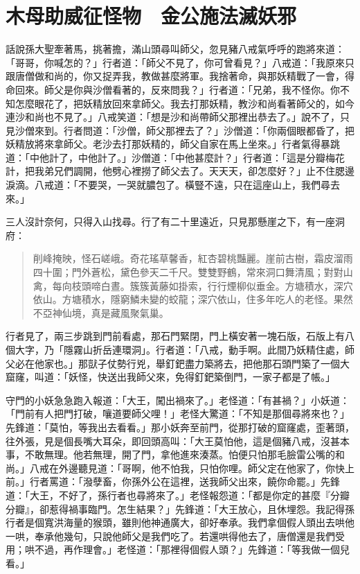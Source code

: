 
\chapter{木母助威征怪物　金公施法滅妖邪}

話說孫大聖牽著馬，挑著擔，滿山頭尋叫師父，忽見豬八戒氣呼呼的跑將來道：「哥哥，你喊怎的？」行者道：「師父不見了，你可曾看見？」八戒道：「我原來只跟唐僧做和尚的，你又捉弄我，教做甚麼將軍。我捨著命，與那妖精戰了一會，得命回來。師父是你與沙僧看著的，反來問我？」行者道：「兄弟，我不怪你。你不知怎麼眼花了，把妖精放回來拿師父。我去打那妖精，教沙和尚看著師父的，如今連沙和尚也不見了。」八戒笑道：「想是沙和尚帶師父那裡出恭去了。」說不了，只見沙僧來到。行者問道：「沙僧，師父那裡去了？」沙僧道：「你兩個眼都昏了，把妖精放將來拿師父。老沙去打那妖精的，師父自家在馬上坐來。」行者氣得暴跳道：「中他計了，中他計了。」沙僧道：「中他甚麼計？」行者道：「這是分瓣梅花計，把我弟兄們調開，他劈心裡撈了師父去了。天天天，卻怎麼好？」止不住腮邊淚滴。八戒道：「不要哭，一哭就膿包了。橫豎不遠，只在這座山上，我們尋去來。」

三人沒計奈何，只得入山找尋。行了有二十里遠近，只見那懸崖之下，有一座洞府：
\begin{quote}
削峰掩映，怪石嵯峨。奇花瑤草馨香，紅杏碧桃豔麗。崖前古樹，霜皮溜雨四十圍；門外蒼松，黛色參天二千尺。雙雙野鶴，常來洞口舞清風；對對山禽，每向枝頭啼白晝。簇簇黃藤如掛索，行行煙柳似垂金。方塘積水，深穴依山。方塘積水，隱窮鱗未變的蛟龍；深穴依山，住多年吃人的老怪。果然不亞神仙境，真是藏風聚氣巢。
\end{quote}

行者見了，兩三步跳到門前看處，那石門緊閉，門上橫安著一塊石版，石版上有八個大字，乃「隱霧山折岳連環洞」。行者道：「八戒，動手啊。此間乃妖精住處，師父必在他家也。」那獃子仗勢行兇，舉釘鈀盡力築將去，把他那石頭門築了一個大窟窿，叫道：「妖怪，快送出我師父來，免得釘鈀築倒門，一家子都是了帳。」

守門的小妖急急跑入報道：「大王，闖出禍來了。」老怪道：「有甚禍？」小妖道：「門前有人把門打破，嚷道要師父哩！」老怪大驚道：「不知是那個尋將來也？」先鋒道：「莫怕，等我出去看看。」那小妖奔至前門，從那打破的窟窿處，歪著頭，往外張，見是個長嘴大耳朵，即回頭高叫：「大王莫怕他，這是個豬八戒，沒甚本事，不敢無理。他若無理，開了門，拿他進來湊蒸。怕便只怕那毛臉雷公嘴的和尚。」八戒在外邊聽見道：「哥啊，他不怕我，只怕你哩。師父定在他家了，你快上前。」行者罵道：「潑孽畜，你孫外公在這裡，送我師父出來，饒你命罷。」先鋒道：「大王，不好了，孫行者也尋將來了。」老怪報怨道：「都是你定的甚麼『分瓣分瓣』，卻惹得禍事臨門。怎生結果？」先鋒道：「大王放心，且休埋怨。我記得孫行者是個寬洪海量的猴頭，雖則他神通廣大，卻好奉承。我們拿個假人頭出去哄他一哄，奉承他幾句，只說他師父是我們吃了。若還哄得他去了，唐僧還是我們受用；哄不過，再作理會。」老怪道：「那裡得個假人頭？」先鋒道：「等我做一個兒看。」

